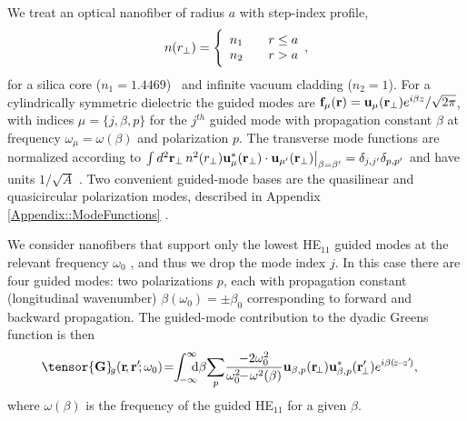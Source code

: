 \documentclass[aps,pra,twocolumn]{revtex4-1} %
\begin{document}
We treat an optical nanofiber of radius $a$ with step-index profile,
	\begin{align} \label{Eq::IndexofRefraction}
		n(r_\perp) = \Bigg\{  
			\begin{array}{l l} n_1 & \quad r \leq a \\
						 n_2 & \quad r > a 
		\end{array},
	\end{align}
for a silica core ($n_1 = 1.4469$)~\cite{kien_field_2004} and infinite vacuum cladding ($n_2 = 1$).  For a cylindrically symmetric dielectric the guided modes are {\color{blue}  $\mathbf{f}_\mu (\mathbf{r}) = \mathbf{u}_\mu (\mathbf{r}_\perp) e^{i\beta z}/\sqrt{2 \pi}$}, with indices $\mu=\{j, \beta , p\}$ for the $j^{th}$ guided mode with propagation constant $\beta$ {\color{blue} at frequency $\omega_\mu=\omega(\beta)$} and polarization $p$.  The transverse mode functions are normalized according to $\int d^2 \mathbf{r}_\perp \, n^2(r_\perp)\mathbf{u}^*_\mu (\mathbf{r}_\perp) \cdot \mathbf{u}_{\mu'} (\mathbf{r}_\perp)\big|_{\beta = \beta'} = \delta_{j,j'}\delta_{p,p'}$ and have units $1/\sqrt{A}$ \cite{le_kien_anisotropy_2014}.  Two convenient guided-mode bases are the quasilinear and quasicircular polarization modes, described in Appendix \ref{Appendix::ModeFunctions} \cite{kien_field_2004}.  

We consider nanofibers that support only the lowest HE$_{11}$ guided modes at the relevant frequency $\omega_0$ \cite{snyder_optical_1983}, and thus we drop the mode index $j$.  In this case there are four guided modes: two polarizations $p$, each with propagation constant (longitudinal wavenumber) $\beta(\omega_0) = \pm\beta_0$ corresponding to forward and backward propagation.  The guided-mode contribution to the dyadic Greens function is then 
	\begin{align} \label{Eq::GreensEigenmodes}
		\tensor{\mathbf{G}}\!_g(\br\!,\br'\!; \omega_0) \!=&\! \int_{\!-\infty}^\infty \!\!\!\! \mathrm{d} \beta \!\sum_{p} \!
\frac{-2\omega_0^2}{\omega_0^2\!\!-\!\omega^2(\beta)} \mathbf{u}_{\beta,p} (\br\!_\perp)\mathbf{u}^*_{\beta,p} 
(\br_{\!\perp}^\prime) e^{i\beta(\!z\!-\!z'\!)},
	\end{align}
where $ \omega(\beta)$ is the frequency of the guided HE$_{11}$ for a given $\beta$.  
\end{document}
